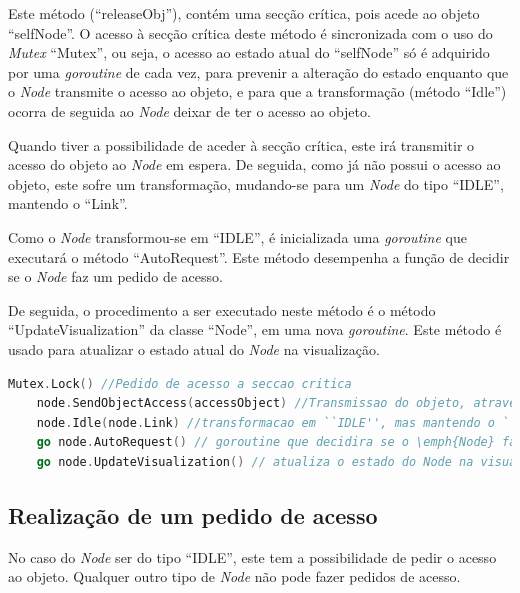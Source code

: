 Este método (``releaseObj''), contém uma secção crítica,
pois acede ao objeto ``selfNode''. 
O acesso à secção crítica deste método é sincronizada com o uso do \emph{Mutex} ``Mutex'', ou seja,
o acesso ao estado atual do ``selfNode'' só é adquirido por uma \emph{goroutine} de cada vez, para prevenir a alteração do estado
enquanto que o \emph{Node} transmite o acesso ao objeto, 
e para que a transformação (método ``Idle'') ocorra de seguida ao \emph{Node} deixar de ter o acesso ao objeto.

Quando tiver a possibilidade de aceder à secção crítica, este irá transmitir o acesso do objeto ao \emph{Node} em espera.
De seguida, como já não possui o acesso ao objeto, este sofre um transformação, mudando-se para um \emph{Node}
do tipo ``IDLE'', mantendo o ``Link''.

Como o \emph{Node} transformou-se em ``IDLE'', é inicializada uma \emph{goroutine} que executará o método ``AutoRequest''.
Este método desempenha a função de decidir se o \emph{Node} faz um pedido de acesso. 

De seguida, o procedimento a ser executado neste método é o método ``UpdateVisualization'' da classe ``Node'',
em uma nova \emph{goroutine}.
Este método é usado para atualizar o estado atual do \emph{Node} na visualização.


\begin{lstlisting}[caption={Acesso à secção crítica, transmição do Objeto, transformação em \emph{Node} ``IDLE'', \emph{goroutine} de decisão de pedido, e atualização na visualização},language=Go]
	Mutex.Lock() //Pedido de acesso a seccao critica
	node.SendObjectAccess(accessObject) //Transmissao do objeto, atraves do envio do objeto ``accessObject''
	node.Idle(node.Link) //transformacao em ``IDLE'', mas mantendo o ``Link''
	go node.AutoRequest() // goroutine que decidira se o \emph{Node} faz um pedido de acesso
	go node.UpdateVisualization() // atualiza o estado do Node na visualizacao

\end{lstlisting}


\subsection*{Realização de um pedido de acesso}
No caso do \emph{Node} ser do tipo ``IDLE'', este tem a possibilidade de pedir o acesso ao objeto.
Qualquer outro tipo de \emph{Node} não pode fazer pedidos de acesso.

